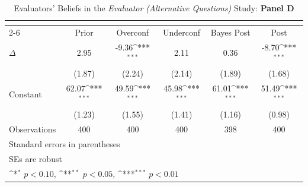\begin{table}[htbp]\centering
\def\sym#1{\ifmmode^{#1}\else\(^{#1}\)\fi}
\caption{Evaluators' Beliefs in the \textit{Evaluator (Alternative Questions)} Study: \textbf{Panel D}}
\begin{tabular}{l*{5}{c}}
\hline\hline
                &\multicolumn{5}{c}{}                                                                          \\\cmidrule(lr){2-6}
                &\multicolumn{1}{c}{Prior}&\multicolumn{1}{c}{Overconf}&\multicolumn{1}{c}{Underconf}&\multicolumn{1}{c}{Bayes Post}&\multicolumn{1}{c}{Post}\\
\hline
$\Delta$        &     2.95         &    -9.36\sym{***}&     2.11         &     0.36         &    -8.70\sym{***}\\
                &   (1.87)         &   (2.24)         &   (2.14)         &   (1.89)         &   (1.68)         \\
Constant        &    62.07\sym{***}&    49.59\sym{***}&    45.98\sym{***}&    61.01\sym{***}&    51.49\sym{***}\\
                &   (1.23)         &   (1.55)         &   (1.41)         &   (1.16)         &   (0.98)         \\
\hline
Observations    &      400         &      400         &      400         &      398         &      400         \\
\hline\hline
\multicolumn{6}{l}{\footnotesize Standard errors in parentheses}\\
\multicolumn{6}{l}{\footnotesize SEs are robust}\\
\multicolumn{6}{l}{\footnotesize \sym{*} \(p<0.10\), \sym{**} \(p<0.05\), \sym{***} \(p<0.01\)}\\
\end{tabular}
\end{table}
